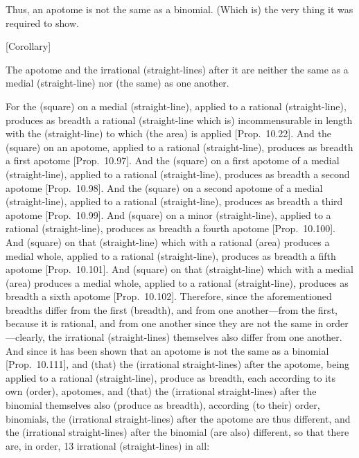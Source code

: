 Thus, an apotome is not the same as a binomial. (Which is) the very thing
it was required to show.


\begin{center}
{\large [Corollary]}
\end{center}\vspace*{-7pt}

The apotome and the  irrational (straight-lines) after it are neither the
same as a medial (straight-line) nor (the same) as one another.

For the (square) on a medial (straight-line), applied to a rational (straight-line), produces as breadth a rational (straight-line which is) incommensurable in length with the
(straight-line) to which  (the area) is applied [Prop.~10.22]. And the (square) on an apotome, applied to a rational (straight-line), produces as breadth a first apotome [Prop.~10.97]. 
And the (square) on a first
apotome of a medial (straight-line), applied to a rational (straight-line),
produces as breadth a second apotome [Prop.~10.98].
And the (square) on a second
apotome of a medial (straight-line), applied to a rational (straight-line),
produces as breadth a third apotome [Prop.~10.99].
And (square) on a minor (straight-line), applied to a rational (straight-line),
produces as breadth a fourth apotome [Prop.~10.100]. And (square) on that (straight-line) which with a rational (area) produces a medial whole, applied to a rational (straight-line),
produces as breadth a fifth apotome [Prop.~10.101]. And (square) on that (straight-line) which with a medial (area) produces a medial whole, applied to a rational
 (straight-line), produces as breadth a sixth apotome [Prop.~10.102]. Therefore, since the aforementioned breadths differ from the first (breadth), and from one another---from the
first, because it is rational, and from one another since they are not the
same in order---clearly,  the  irrational (straight-lines)
themselves also differ from one another. And since it has been shown that an apotome
is not the same as a binomial [Prop.~10.111],
and (that) the (irrational straight-lines) after the apotome, being applied to
a rational (straight-line), produce as breadth, each according to its own (order), apotomes, and (that) the (irrational straight-lines) after
the binomial  themselves also (produce as breadth), according (to their) order, binomials, 
the (irrational straight-lines) after the apotome are thus different, and the
(irrational straight-lines) after the binomial (are also) different, so that
there are, in order, 13 irrational (straight-lines) in all:

